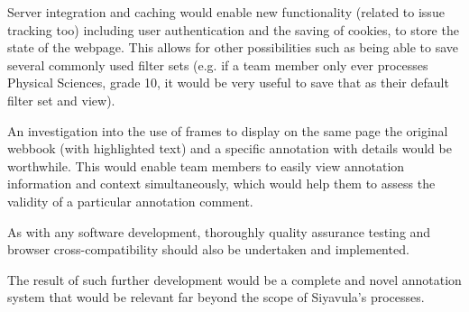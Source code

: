 Server integration and caching would enable new functionality (related to issue tracking too) including user authentication and the saving of cookies, to store the state of the webpage. This allows for other possibilities such as being able to save several commonly used filter sets (e.g. if a team member only ever processes Physical Sciences, grade 10, it would be very useful to save that as their default filter set and view). 

An investigation into the use of frames to display on the same page the original webbook (with highlighted text) and a specific annotation with details would be worthwhile. This would enable team members to easily view annotation information and context simultaneously, which would help them to assess the validity of a particular annotation comment.

As with any software development, thoroughly quality assurance testing and browser cross-compatibility should also be undertaken and implemented. 

The result of such further development would be a complete and novel annotation system that would be relevant far beyond the scope of Siyavula's processes. 
